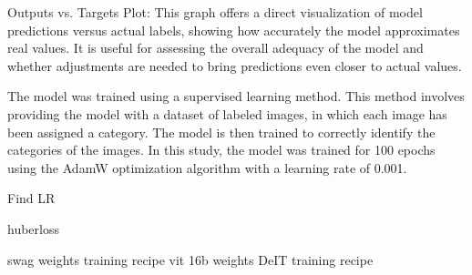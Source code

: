Outputs vs. Targets Plot:
This graph offers a direct visualization of model predictions versus actual labels, showing how accurately the model approximates real values.
It is useful for assessing the overall adequacy of the model and whether adjustments are needed to bring predictions even closer to actual values.


The model was trained using a supervised learning method. This method involves providing the model with a dataset of labeled images, in which each image has been assigned a category. The model is then trained to correctly identify the categories of the images. In this study, the model was trained for 100 epochs using the AdamW optimization algorithm with a learning rate of 0.001.

Find LR \cite{smith2017cyclical}

huberloss \cite{huber1964robust}


swag weights training recipe \cite{singh2022revisiting}
vit 16b weights DeIT training recipe \cite{touvron2021training}